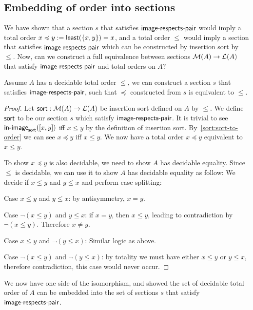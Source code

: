 \subsection{Embedding of order into sections}

We have shown that a section $s$ that satisfies $\operatorname{\mathsf{image-respects-pair}}$ would imply a total order
$x \preccurlyeq y := \operatorname{\mathsf{least}}(\{x, y\}) = x$,
and a total order $\leq$ would imply a section that satisfies $\operatorname{\mathsf{image-respects-pair}}$ which can
be constructed by insertion sort by $\leq$. Now, can we construct a full equivalence
between sections $\mathcal{M}(A) \to \mathcal{L}(A)$ that satisfy $\operatorname{\mathsf{image-respects-pair}}$ and total orders on $A$?

\begin{proposition}\label{sort:o2s2o}
    Assume $A$ has a decidable total order $\leq$, we can construct a section $s$ that
    satisfies $\operatorname{\mathsf{image-respects-pair}}$, such that $\preccurlyeq$ constructed from $s$ is equivalent
    to $\leq$.
\end{proposition}

\begin{proof}
    Let $\operatorname{\mathsf{sort}} : \mathcal{M}(A) \to \mathcal{L}(A)$ be insertion sort defined on $A$ by $\leq$.
    We define $\operatorname{\mathsf{sort}}$ to be our section $s$ which satisfy $\operatorname{\mathsf{image-respects-pair}}$.
    It is trivial to see $\operatorname{\mathsf{in-image}}_{\operatorname{\mathsf{sort}}}([x, y])$ iff $x \leq y$ by the definition
    of insertion sort. By~\ref{sort:sort-to-order} we can see $x \preccurlyeq y$ iff $x \leq y$.
    We now have a total order $x \preccurlyeq y$ equivalent to $x \leq y$.

    To show $x \preccurlyeq y$ is also decidable, we need to show $A$ has decidable equality.
    Since $\leq$ is decidable, we can use it to show $A$ has decidable equality as follow:
    We decide if $x \leq y$ and $y \leq x$ and perform case splitting:

    Case $x \leq y$ and $y \leq x$: by antisymmetry, $x = y$.
    
    Case $\neg(x \leq y)$ and $y \leq x$: if $x = y$, then $x \leq y$,
    leading to contradiction by $\neg(x \leq y)$. Therefore $x \neq y$.
    
    Case $x \leq y$ and $\neg(y \leq x)$: Similar logic as above.

    Case $\neg(x \leq y)$ and $\neg(y \leq x)$: by totality we must have either
    $x \leq y$ or $y \leq x$, therefore contradiction, this case would never occur.
\end{proof}

We now have one side of the isomorphism, and showed the set of decidable total order of $A$
can be embedded into the set of sections $s$ that satisfy $\operatorname{\mathsf{image-respects-pair}}$.

